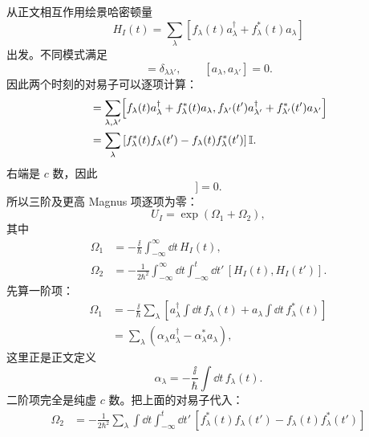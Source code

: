 \begin{derivation}
从正文相互作用绘景哈密顿量
\begin{equation*}
 H_I(t)
 =\sum_\lambda
 \left[f_\lambda(t)a_\lambda^\dagger
 +f_\lambda^*(t)a_\lambda\right]
\end{equation*}
出发。不同模式满足
\begin{equation*}
 [a_\lambda,a_{\lambda'}^\dagger]=\delta_{\lambda\lambda'},
 \qquad
 [a_\lambda,a_{\lambda'}]=0.
\end{equation*}
因此两个时刻的对易子可以逐项计算：
\begin{align*}
 [H_I(t),H_I(t')]
 &=\sum_{\lambda,\lambda'}
 \Bigl[
 f_\lambda(t)a_\lambda^\dagger+f_\lambda^*(t)a_\lambda,
 f_{\lambda'}(t')a_{\lambda'}^\dagger+f_{\lambda'}^*(t')a_{\lambda'}
 \Bigr]\\
 &=\sum_\lambda
 \left[
 f_\lambda^*(t)f_\lambda(t')
 -f_\lambda(t)f_\lambda^*(t')
 \right]\mathbb I.
\end{align*}
右端是 $c$ 数，因此
\begin{equation*}
 [H_I(t_1),[H_I(t_2),H_I(t_3)]]=0.
\end{equation*}
所以三阶及更高 Magnus 项逐项为零：
\begin{equation*}
 U_I=\exp(\Omega_1+\Omega_2),
\end{equation*}
其中
\begin{align*}
 \Omega_1
 &=-\frac{\ii}{\hbar}
 \int_{-\infty}^{\infty}\dd t\,H_I(t),\\
 \Omega_2
 &=-\frac1{2\hbar^2}
 \int_{-\infty}^{\infty}\dd t
 \int_{-\infty}^{t}\dd t'\,
 [H_I(t),H_I(t')].
\end{align*}
先算一阶项：
\begin{align*}
 \Omega_1
 &=-\frac{\ii}{\hbar}
 \sum_\lambda
 \left[
 a_\lambda^\dagger\int\dd t\,f_\lambda(t)
 +a_\lambda\int\dd t\,f_\lambda^*(t)
 \right]\\
 &=\sum_\lambda
 \left(\alpha_\lambda a_\lambda^\dagger
 -\alpha_\lambda^*a_\lambda\right),
\end{align*}
这里正是正文定义
\begin{equation*}
 \alpha_\lambda=-\frac{\ii}{\hbar}\int\dd t\,f_\lambda(t).
\end{equation*}
二阶项完全是纯虚 $c$ 数。把上面的对易子代入：
\begin{align*}
 \Omega_2
 &=-\frac1{2\hbar^2}
 \sum_\lambda
 \int\dd t\int_{-\infty}^{t}\dd t'\,
 \left[f_\lambda^*(t)f_\lambda(t')
 -f_\lambda(t)f_\lambda^*(t')\right]\\

\end{align*}
\end{derivation}
